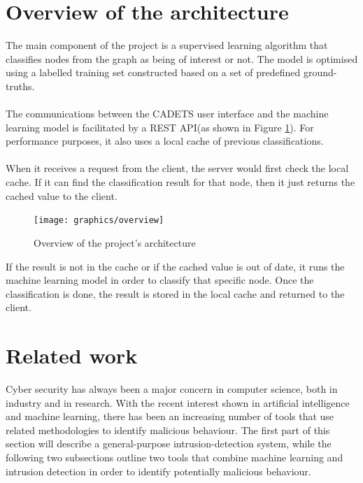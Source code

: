 	\section{Overview of the architecture}\label{1.2}
	The main component of the project is a supervised learning algorithm that classifies nodes from the graph as being of interest or not. The model is optimised using a labelled training set constructed based on a set of predefined ground-truths.
	\\ \\
	The communications between the CADETS user interface and the machine learning model is facilitated by a REST API(as shown in Figure \ref{Figure 1.2}). For performance purposes, it also uses a local cache of previous classifications. 
	\\ \\ 
	When it receives a request from the client, the server would first check the local cache. If it can find the classification result for that node, then it just returns the cached value to the client.
	\begin{figure}[H]
		\centering
		\texttt{[image: graphics/overview]}
		\caption{Overview of the project's architecture}
		\label{Figure 1.2}
	\end{figure}
	
	If the result is not in the cache or if the cached value is out of date, it runs the machine learning model in order to classify that specific node. Once the classification is done, the result is stored in the local cache and returned to the client. 
	
	\section{Related work}
	Cyber security has always been a major concern in computer science, both in industry and in research. With the recent interest shown in artificial intelligence and machine learning, there has been an increasing number of tools that use related methodologies to identify malicious behaviour. The first 
	part of this section will describe a general-purpose intrusion-detection system, while the following two subsections outline two tools that combine machine learning and intrusion detection in order to identify potentially malicious behaviour.
	
